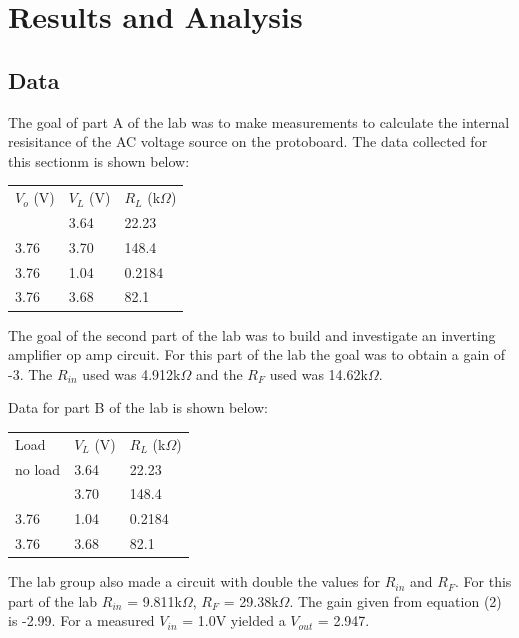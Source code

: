 \documentclass[twocolumn, amsmath]{revtex4}
\begin{document}
\section{Results and Analysis}

\subsection{Data}
The goal of part A of the lab was to make measurements to calculate the internal resisitance of the AC voltage source on the protoboard. The data collected for this sectionm is shown below:

\begin{center}
	\begin{ruledtabular}
    \begin{tabular}{ l l l }
	$V_{o}$ (V) & $V_{L}$ (V) & $R_{L}$ (k$\Omega$) \\ \colrule
	3.76 & 3.64 & 22.23  \\
	3.76 & 3.70 & 148.4  \\
	3.76 & 1.04 & 0.2184  \\
	3.76 & 3.68 & 82.1  \\
\end{tabular}
    \end{ruledtabular}
\end{center}

The goal of the second part of the lab was to build and investigate an inverting amplifier op amp circuit. For this part of the lab the goal was to obtain a gain of -3. The $R_{in}$ used was 4.912k$\Omega$ and the $R_{F}$ used was 14.62k$\Omega$.

Data for part B of the lab is shown below:

\begin{center}
	\begin{ruledtabular}
    \begin{tabular}{ l l l }
	Load & $V_{L}$ (V) & $R_{L}$ (k$\Omega$) \\ \colrule
	no load & 3.64 & 22.23  \\
	 & 3.70 & 148.4  \\
	3.76 & 1.04 & 0.2184  \\
	3.76 & 3.68 & 82.1  \\
\end{tabular}
    \end{ruledtabular}
\end{center}

The lab group also made a circuit with double the values for $R_{in}$ and $R_{F}$. For this part of the lab $R_{in}$ = 9.811k$\Omega$, $R_{F}$ = 29.38k$\Omega$. The gain given from equation (2) is -2.99. For a measured $V_{in}$ = 1.0V yielded a $V_{out}$ = 2.947.
\end{document}
